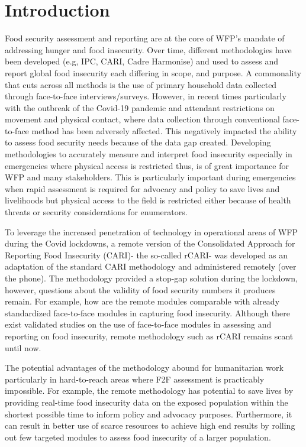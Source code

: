 \documentclass[11pt,harvard]{article}
\begin{document}
	\pagebreak
	
	\section{Introduction}
	
	Food security assessment and reporting are at the core of WFP’s mandate of addressing hunger and food insecurity. Over time, different methodologies have been developed (e.g, IPC, CARI, Cadre Harmonise) and used to assess and report global food insecurity each differing in scope, and purpose. A commonality that cuts across all methods is the use of primary household data collected through face-to-face interviews/surveys. However, in recent times particularly with the outbreak of the Covid-19 pandemic and attendant restrictions on movement and physical contact, where data collection through conventional face-to-face method has been adversely affected. This negatively impacted the ability to assess food security needs because of the data gap created. Developing methodologies to accurately measure and interpret food insecurity especially in emergencies where physical access is restricted thus, is of great importance for WFP and many stakeholders. This is particularly important during emergencies when rapid assessment is required for advocacy and policy to save lives and livelihoods but physical access to the field is restricted either because of health threats or security considerations for enumerators. 
	
	To leverage the increased penetration of technology in operational areas of WFP during the Covid lockdowns, a remote version of the Consolidated Approach for Reporting Food Insecurity (CARI)- the so-called rCARI- was developed as an adaptation of the standard CARI methodology and administered remotely (over the phone). The methodology provided a stop-gap solution during the lockdown, however, questions about the validity of food security numbers it produces remain. For example, how are the remote modules comparable with already standardized face-to-face modules in capturing food insecurity. Although there exist validated studies on the use of face-to-face modules in assessing and reporting on food insecurity, remote methodology such as rCARI remains scant until now. 
	
	The potential advantages of the methodology abound for humanitarian work particularly in hard-to-reach areas where F2F assessment is practicably impossible. For example, the remote methodology has potential to save lives by providing real-time food insecurity data on the exposed population within the shortest possible time to inform policy and advocacy purposes. Furthermore, it can result in better use of scarce resources to achieve high end results by rolling out few targeted modules to assess food insecurity of a larger population.  	
	
\end{document}
